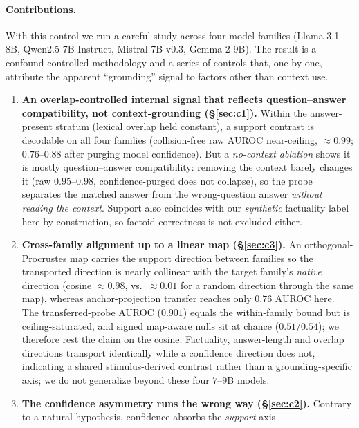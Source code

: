 \paragraph{Contributions.}
With this control we run a careful study across four model families
(Llama-3.1-8B, Qwen2.5-7B-Instruct, Mistral-7B-v0.3, Gemma-2-9B). The result is a
confound-controlled methodology and a series of controls that, one by one, attribute
the apparent ``grounding'' signal to factors other than context use.
\begin{enumerate}[leftmargin=1.4em,itemsep=1pt,topsep=2pt]
  \item \textbf{An overlap-controlled internal signal that reflects
    question--answer compatibility, not context-grounding (\S\ref{sec:c1}).} Within the answer-present stratum (lexical
    overlap held constant), a support contrast is decodable on all four families
    (collision-free raw AUROC near-ceiling, ${\approx}0.99$; $0.76$--$0.88$ after
    purging model confidence). But a \emph{no-context ablation} shows it is mostly
    question--answer compatibility: removing the context barely changes it (raw
    $0.95$--$0.98$, confidence-purged does not collapse), so the probe separates the matched
    answer from the wrong-question answer \emph{without reading the context}. Support
    also coincides with our \emph{synthetic} factuality label here by construction, so
    factoid-correctness is not excluded either.
  \item \textbf{Cross-family alignment up to a linear map (\S\ref{sec:c3}).} An
    orthogonal-Procrustes map carries the support direction between families so the
    transported direction is nearly collinear with the target family's \emph{native}
    direction (cosine ${\approx}0.98$, vs.\ ${\approx}0.01$ for a random direction
    through the same map), whereas anchor-projection transfer
    \citep{kim2026crossfamily} reaches only $0.76$ AUROC here. The transferred-probe AUROC ($0.901$) equals the
    within-family bound but is ceiling-saturated, and signed map-aware nulls sit at
    chance ($0.51$/$0.54$); we therefore rest the claim on the cosine. Factuality, answer-length and overlap directions transport identically while a
    confidence direction does not, indicating a shared stimulus-derived contrast
    rather than a grounding-specific axis; we do not generalize
    beyond these four $7$--$9$B models.
  \item \textbf{The confidence asymmetry runs the wrong way (\S\ref{sec:c2}).}
    Contrary to a natural hypothesis, confidence absorbs the \emph{support} axis

\end{enumerate}
